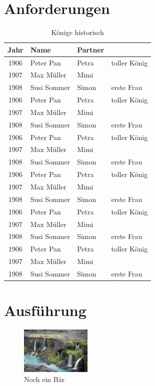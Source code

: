 \documentclass[
a5paper,
10pt, 
onecolumn,
openany,
]{memoir}
\begin{document}
\lipsum[1-1] 

\section{Anforderungen}

\lipsum[1-1]

\begin{table}
  \centering
  \begin{tabularx}{0.9\textwidth}{ c l l X }
    Jahr & Name & Partner & \\
    \hline\noalign{\smallskip}
    1906 & Peter Pan & Petra & toller König \\ 
    1907 & Max Müller & Mimi &  \\  
    1908 & Susi Sommer & Simon & erste Frau \\
    1906 & Peter Pan & Petra & toller König \\ 
    1907 & Max Müller & Mimi &  \\  
    1908 & Susi Sommer & Simon & erste Frau \\
    1906 & Peter Pan & Petra & toller König \\ 
    1907 & Max Müller & Mimi &  \\  
    1908 & Susi Sommer & Simon & erste Frau \\
    1906 & Peter Pan & Petra & toller König \\ 
    1907 & Max Müller & Mimi &  \\  
    1908 & Susi Sommer & Simon & erste Frau \\
    1906 & Peter Pan & Petra & toller König \\ 
    1907 & Max Müller & Mimi &  \\  
    1908 & Susi Sommer & Simon & erste Frau \\
    1906 & Peter Pan & Petra & toller König \\ 
    1907 & Max Müller & Mimi &  \\  
    1908 & Susi Sommer & Simon & erste Frau \\
  \end{tabularx}
  \caption{Könige historisch}
  \label{fig:tab_koenige_historisch}
\end{table}

\section{Ausführung}

\lipsum[1-1]

\begin{figure}
  \centering
  \includegraphics[width=0.3\textwidth]{fotos/b}
  \caption{Noch ein Bär}
\end{figure}
\end{document}
